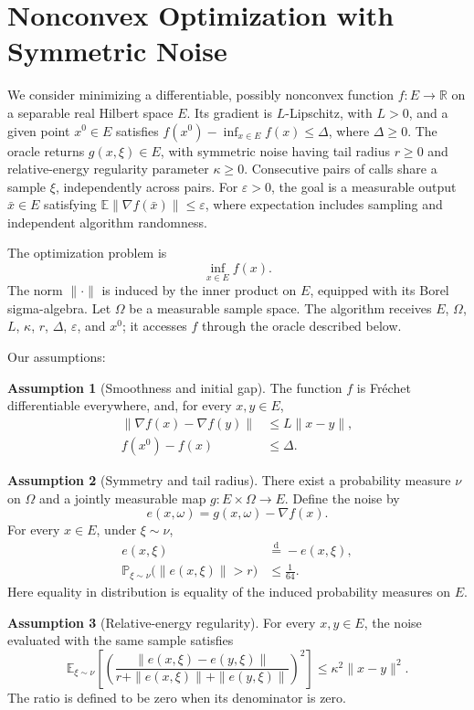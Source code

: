 \documentclass[10pt]{article}
\theoremstyle{definition}
\newtheorem{assumption}{Assumption}
\begin{document}
\section*{Nonconvex Optimization with Symmetric Noise}
We consider minimizing a differentiable, possibly nonconvex function $f:E\to\mathbb{R}$ on a separable real Hilbert space $E$. Its gradient is $L$-Lipschitz, with $L>0$, and a given point $x^0\in E$ satisfies $f(x^0)-\inf_{x\in E}f(x)\leq\Delta$, where $\Delta\geq0$. The oracle returns $g(x,\xi)\in E$, with symmetric noise having tail radius $r\geq0$ and relative-energy regularity parameter $\kappa\geq0$. Consecutive pairs of calls share a sample $\xi$, independently across pairs. For $\varepsilon>0$, the goal is a measurable output $\bar{x}\in E$ satisfying $\mathbb{E}\|\nabla f(\bar{x})\|\leq\varepsilon$, where expectation includes sampling and independent algorithm randomness.

The optimization problem is
\[
\inf_{x\in E} f(x).
\]
The norm $\|\cdot\|$ is induced by the inner product on $E$, equipped with its Borel sigma-algebra. Let $\Omega$ be a measurable sample space. The algorithm receives $E$, $\Omega$, $L$, $\kappa$, $r$, $\Delta$, $\varepsilon$, and $x^0$; it accesses $f$ through the oracle described below.

Our assumptions:
\begin{assumption}[Smoothness and initial gap]
The function $f$ is Fr\'echet differentiable everywhere, and, for every $x,y\in E$,
\[
\begin{aligned}
\|\nabla f(x)-\nabla f(y)\|&\leq L\|x-y\|,\\
f(x^0)-f(x)&\leq\Delta.
\end{aligned}
\]
\end{assumption}

\begin{assumption}[Symmetry and tail radius]
There exist a probability measure $\nu$ on $\Omega$ and a jointly measurable map $g:E\times\Omega\to E$. Define the noise by
\[
e(x,\omega)=g(x,\omega)-\nabla f(x).
\]
For every $x\in E$, under $\xi\sim\nu$,
\[
\begin{aligned}
e(x,\xi)&\overset{\mathrm{d}}{=}-e(x,\xi),\\
\mathbb{P}_{\xi\sim\nu}\bigl(\|e(x,\xi)\|>r\bigr)&\leq\frac{1}{64}.
\end{aligned}
\]
Here equality in distribution is equality of the induced probability measures on $E$.
\end{assumption}

\begin{assumption}[Relative-energy regularity]
For every $x,y\in E$, the noise evaluated with the same sample satisfies
\[
\mathbb{E}_{\xi\sim\nu}\left[
\left(
\frac{\|e(x,\xi)-e(y,\xi)\|}
{r+\|e(x,\xi)\|+\|e(y,\xi)\|}
\right)^2
\right]
\leq\kappa^2\|x-y\|^2.
\]
The ratio is defined to be zero when its denominator is zero.
\end{assumption}
\end{document}
